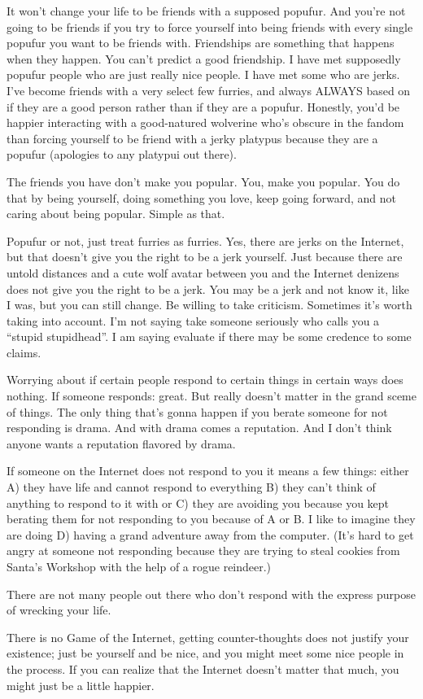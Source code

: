 It won't change your life to be friends with a supposed popufur. And you're not going to be friends if you try to force yourself into being friends with every single popufur you want to be friends with. Friendships are something that happens when they happen. You can't predict a good friendship. I have met supposedly popufur people who are just really nice people. I have met some who are jerks. I've become friends with a very select few furries, and always ALWAYS based on if they are a good person rather than if they are a popufur. Honestly, you'd be happier interacting with a good-natured wolverine who's obscure in the fandom than forcing yourself to be friend with a jerky platypus because they are a popufur (apologies to any platypui out there).

The friends you have don't make you popular. You, make you popular. You do that by being yourself, doing something you love, keep going forward, and not caring about being popular. Simple as that.

Popufur or not, just treat furries as furries. Yes, there are jerks on the Internet, but that doesn't give you the right to be a jerk yourself. Just because there are untold distances and a cute wolf avatar between you and the Internet denizens does not give you the right to be a jerk. You may be a jerk and not know it, like I was, but you can still change. Be willing to take criticism. Sometimes it's worth taking into account. I'm not saying take someone seriously who calls you a ``stupid stupidhead''. I am saying evaluate if there may be some credence to some claims.

Worrying about if certain people respond to certain things in certain ways does nothing. If someone responds: great. But really doesn't matter in the grand sceme of things. The only thing that's gonna happen if you berate someone for not responding is drama. And with drama comes a reputation. And I don't think anyone wants a reputation flavored by drama.

If someone on the Internet does not respond to you it means a few things: either A) they have life and cannot respond to everything B) they can't think of anything to respond to it with or C) they are avoiding you because you kept berating them for not responding to you because of A or B. I like to imagine they are doing D) having a grand adventure away from the computer. (It's hard to get angry at someone not responding because they are trying to steal cookies from Santa's Workshop with the help of a rogue reindeer.)

There are not many people out there who don't respond with the express purpose of wrecking your life.

There is no Game of the Internet, getting counter-thoughts does not justify your existence; just be yourself and be nice, and you might meet some nice people in the process. If you can realize that the Internet doesn't matter that much, you might just be a little happier.
